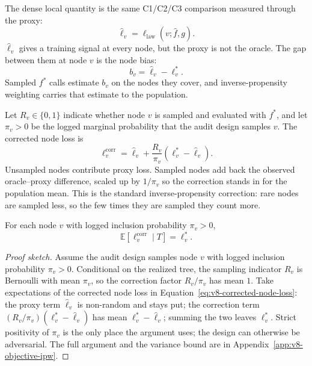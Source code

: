 The dense local quantity is the same C1/C2/C3 comparison measured
through the proxy:
\[
  \widehat\ell_v
  =
  \ell_{\mathrm{law}}(v;\widehat f,g).
\]
\(\widehat\ell_v\) gives a training signal at every node, but the
proxy is not the oracle. The gap between them at node \(v\) is the
node bias:
\[
  b_v=\widehat\ell_v-\ell_v^\ast .
\]
Sampled \(f^\ast\) calls estimate \(b_v\) on the nodes they cover, and
inverse-propensity weighting carries that estimate to the population.

Let \(R_v\in\{0,1\}\) indicate whether node \(v\) is sampled and
evaluated with \(f^\ast\), and let \(\pi_v>0\) be the logged marginal
probability that the audit design samples \(v\). The corrected node
loss is
\begin{equation}
\label{eq:v8-corrected-node-loss}
  \ell_v^{\mathrm{corr}}
  =
  \widehat\ell_v
  +
  \frac{R_v}{\pi_v}
  \left(\ell_v^\ast-\widehat\ell_v\right).
\end{equation}
Unsampled nodes contribute proxy loss. Sampled nodes add back the
observed oracle--proxy difference, scaled up by \(1/\pi_v\) so the
correction stands in for the population mean. This is the standard
inverse-propensity correction: rare nodes are sampled less, so the
few times they are sampled they count more.

\begin{proposition}\label{prop:v10-corrected-loss-unbiased}
For each node \(v\) with logged inclusion probability \(\pi_v>0\),
\[
  \mathbb E\!\left[\ell_v^{\mathrm{corr}}\mid T\right]
  =\ell_v^\ast .
\]
\end{proposition}

\begin{proof}[Proof sketch]
Assume the audit design samples node \(v\) with logged inclusion
probability \(\pi_v>0\). Conditional on the realized tree, the
sampling indicator \(R_v\) is Bernoulli with mean \(\pi_v\), so the
correction factor \(R_v/\pi_v\) has mean \(1\). Take expectations of
the corrected node loss in
Equation~\eqref{eq:v8-corrected-node-loss}: the proxy term
\(\widehat\ell_v\) is non-random and stays put; the correction term
\((R_v/\pi_v)(\ell_v^\ast-\widehat\ell_v)\) has mean
\(\ell_v^\ast-\widehat\ell_v\); summing the two leaves
\(\ell_v^\ast\). Strict positivity of \(\pi_v\) is the only place the
argument uses; the design can otherwise be adversarial. The full
argument and the variance bound are in
Appendix~\ref{app:v8-objective-ipw}.
\end{proof}

